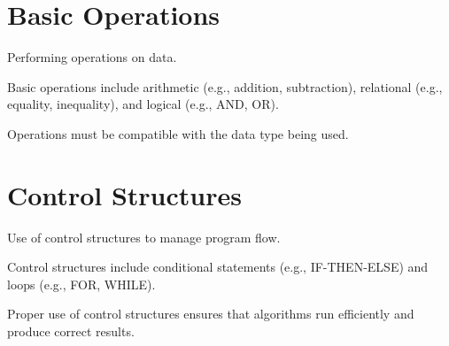 \documentclass{article}
\begin{document}
\section*{Basic Operations}
\begin{description}[leftmargin=!,labelwidth=\widthof{\bfseries Key Concept}]
	\item[Key Concept] Performing operations on data.
	\item[Content] Basic operations include arithmetic (e.g., addition, subtraction), relational (e.g., equality, inequality), and logical (e.g., AND, OR).
	\item[Notes] Operations must be compatible with the data type being used.
\end{description}

\section*{Control Structures}
\begin{description}[leftmargin=!,labelwidth=\widthof{\bfseries Key Concept}]
	\item[Key Concept] Use of control structures to manage program flow.
	\item[Content] Control structures include conditional statements (e.g., IF-THEN-ELSE) and loops (e.g., FOR, WHILE).
	\item[Notes] Proper use of control structures ensures that algorithms run efficiently and produce correct results.
\end{description}
\end{document}
